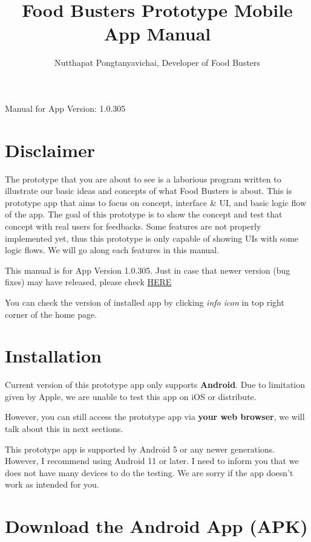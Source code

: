 \documentclass[a4paper,12pt]{article}
\begin{document}
\title{\textbf{Food Busters Prototype Mobile App Manual}}
\author{Nutthapat Pongtanyavichai, Developer of Food Busters}

\maketitle
\centerline{\LARGE{Manual for App Version: 1.0.305}}

\tableofcontents

\pagebreak
\section{Disclaimer}

The prototype that you are about to see is a laborious program written to
illustrate our basic ideas and concepts of what Food Busters is about.
This is prototype app that aims to focus on concept, interface \& UI,
and basic logic flow of the app. The goal of this prototype is to show the concept
and test that concept with real users for feedbacks. Some features are not properly implemented yet, thus this prototype is only capable of showing UIs with some logic flows.
We will go along each features in this manual.

This manual is for App Version 1.0.305. Just in case that newer version (bug fixes) may
have released, please check \href{https://github.com/Food-Busters/food_busters/releases}{HERE}

You can check the version of installed app by clicking \textit{info icon}
in top right corner of the home page.

\section{Installation}

Current version of this prototype app only supports \textbf{Android}. Due to
limitation given by Apple, we are unable to test this app on iOS or distribute.

However, you can still access the prototype app via \textbf{your web browser},
we will talk about this in next sections.

This prototype app is supported by Android 5 or any newer generations.
However, I recommend using Android 11 or later.
I need to inform you that we does not have many devices to do the testing.
We are sorry if the app doesn't work as intended for you.

\section*{Download the Android App (APK)}
\end{document}
